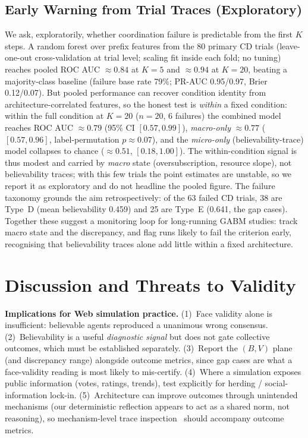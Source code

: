 \documentclass[runningheads]{llncs}
\begin{document}
\subsection{Early Warning from Trial Traces (Exploratory)}\label{sec:results-warning}
We ask, exploratorily, whether coordination failure is predictable from the first $K$ steps. A random forest over prefix features from the 80 primary CD trials (leave-one-out cross-validation at trial level; scaling fit inside each fold; no tuning) reaches pooled ROC AUC $\approx 0.84$ at $K{=}5$ and $\approx 0.94$ at $K{=}20$, beating a majority-class baseline (failure base rate 79\%; PR-AUC 0.95/0.97, Brier 0.12/0.07). But pooled performance can recover condition identity from architecture-correlated features, so the honest test is \emph{within} a fixed condition: within the full condition at $K{=}20$ ($n=20$, 6 failures) the combined model reaches ROC AUC $\approx 0.79$ (95\% CI $[0.57,0.99]$), \emph{macro-only} $\approx 0.77$ ($[0.57,0.96]$, label-permutation $p\approx0.07$), and the \emph{micro-only} (believability-trace) model collapses to chance ($\approx 0.51$, $[0.18,1.00]$). The within-condition signal is thus modest and carried by \emph{macro} state (oversubscription, resource slope), not believability traces; with this few trials the point estimates are unstable, so we report it as exploratory and do not headline the pooled figure. The failure taxonomy grounds the aim retrospectively: of the 63 failed CD trials, 38 are Type~D (mean believability 0.459) and 25 are Type~E (0.641, the gap cases). Together these suggest a monitoring loop for long-running GABM studies: track macro state and the discrepancy, and flag runs likely to fail the criterion early, recognising that believability traces alone add little within a fixed architecture.




\section{Discussion and Threats to Validity}\label{sec:discussion}
\textbf{Implications for Web simulation practice.} (1)~Face validity alone is insufficient: believable agents reproduced a unanimous wrong consensus. (2)~Believability is a useful \emph{diagnostic signal} but does not gate collective outcomes, which must be established separately. (3)~Report the $(B,V)$ plane (and discrepancy range) alongside outcome metrics, since gap cases are what a face-validity reading is most likely to mis-certify. (4)~Where a simulation exposes public information (votes, ratings, trends), test explicitly for herding / social-information lock-in. (5)~Architecture can improve outcomes through unintended mechanisms (our deterministic reflection appears to act as a shared norm, not reasoning), so mechanism-level trace inspection~\cite{zhao2026mechanism,cemri2025fails} should accompany outcome metrics.
\end{document}

